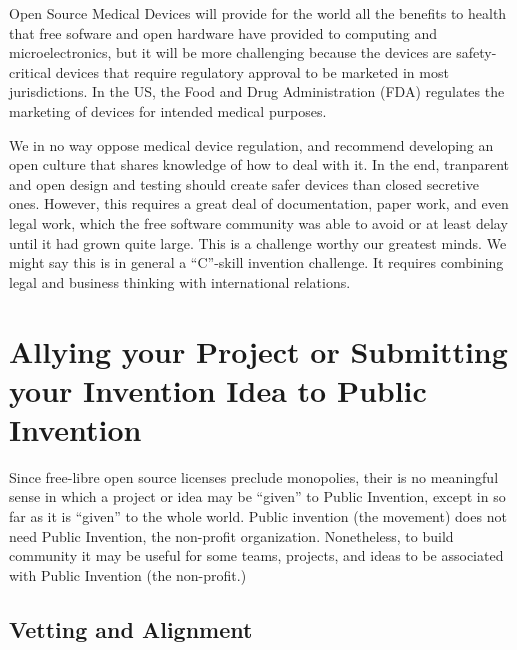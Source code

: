 \documentclass[
	fontsize=10pt, %
	twoside=false, %
	secnumdepth=1, %
]{kaobook}
\begin{document}
Open Source Medical Devices will provide for the world all the benefits to health
that free sofware and open hardware have provided to computing and microelectronics,
but it will be more challenging because the devices are safety-critical devices that
require regulatory approval to be marketed in most jurisdictions. In the US, the
Food and Drug Administration (FDA) regulates the marketing of devices for intended
medical purposes.

We in no way oppose medical device regulation, and recommend developing an open culture
that shares knowledge of how to deal with it. In the end, tranparent and open
design and testing should create safer devices than closed secretive ones. However,
this requires a great deal of documentation, paper work, and even legal work, which
the free software community was able to avoid or at least delay until it had grown
quite large.
This is a challenge worthy our greatest minds. We might say this is in general
a ``C''-skill invention challenge. It requires combining legal and
business thinking with international relations.

\chapter{Allying your Project or Submitting your Invention Idea to Public Invention}

Since free-libre open source licenses preclude monopolies, their is no
meaningful sense in which a project or idea may be ``given'' to Public Invention,
except in so far as it is ``given'' to the whole world.
Public invention (the movement) does not need Public Invention, the non-profit organization.
Nonetheless, to build community it may be useful for some teams, projects, and ideas
to be associated with Public Invention (the non-profit.)

\section{Vetting and Alignment}
\end{document}

